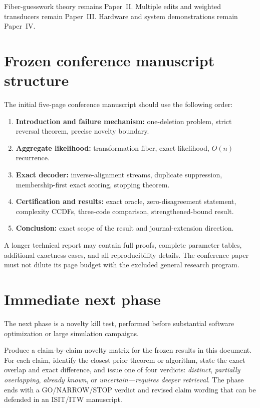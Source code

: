 \documentclass[11pt]{article}
\theoremstyle{definition}
\theoremstyle{remark}
\begin{document}
Fiber-guesswork theory remains Paper~II. Multiple edits and weighted transducers remain Paper~III. Hardware and system demonstrations remain Paper~IV.

\section{Frozen conference manuscript structure}

The initial five-page conference manuscript should use the following order:
\begin{enumerate}
  \item \textbf{Introduction and failure mechanism:} one-deletion problem, strict reversal theorem, precise novelty boundary.
  \item \textbf{Aggregate likelihood:} transformation fiber, exact likelihood, $O(n)$ recurrence.
  \item \textbf{Exact decoder:} inverse-alignment streams, duplicate suppression, membership-first exact scoring, stopping theorem.
  \item \textbf{Certification and results:} exact oracle, zero-disagreement statement, complexity CCDFs, three-code comparison, strengthened-bound result.
  \item \textbf{Conclusion:} exact scope of the result and journal-extension direction.
\end{enumerate}

A longer technical report may contain full proofs, complete parameter tables, additional exactness cases, and all reproducibility details. The conference paper must not dilute its page budget with the excluded general research program.

\section{Immediate next phase}

The next phase is a novelty kill test, performed before substantial software optimization or large simulation campaigns.

\begin{gatebox}
Produce a claim-by-claim novelty matrix for the frozen results in this document. For each claim, identify the closest prior theorem or algorithm, state the exact overlap and exact difference, and issue one of four verdicts: \emph{distinct}, \emph{partially overlapping}, \emph{already known}, or \emph{uncertain---requires deeper retrieval}. The phase ends with a GO/NARROW/STOP verdict and revised claim wording that can be defended in an ISIT/ITW manuscript.
\end{gatebox}
\end{document}
